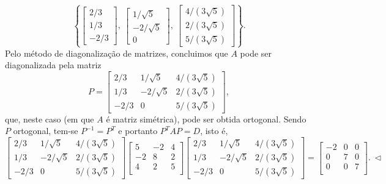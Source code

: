 \documentclass[../livro.tex]{subfiles}
\begin{document}
\begin{example}
	\begin{equation}
	\left\lbrace
	\begin{bmatrix}
	2/3 \\ 1/3 \\ -2/3
	\end{bmatrix}, \
	\begin{bmatrix}
	1/\sqrt{5} \\ -2/\sqrt{5} \\ 0
	\end{bmatrix}, \
	\begin{bmatrix}
	4/(3\sqrt{5}) \\ 2/(3\sqrt{5}) \\ 5/(3\sqrt{5})
	\end{bmatrix}
	\right\rbrace.
	\end{equation} Pelo método de diagonalização de matrizes, concluimos que $A$ pode ser diagonalizada pela matriz 
	\begin{equation}
	P = 
	\begin{bmatrix}
	2/3  & 1/\sqrt{5}  & 4/(3\sqrt{5}) \\ 
	1/3  & -2/\sqrt{5} & 2/(3\sqrt{5}) \\ 
	-2/3 &       0     & 5/(3\sqrt{5})
	\end{bmatrix},
	\end{equation} que, neste caso (em que $A$ é matriz simétrica), pode ser obtida ortogonal. Sendo $P$ ortogonal, tem-se $P^{-1} = P^T$ e portanto $P^{T} A P =  D$, isto é,
	\begin{equation}
	\begin{bmatrix}
	2/3  & 1/\sqrt{5}  & 4/(3\sqrt{5}) \\ 
	1/3  & -2/\sqrt{5} & 2/(3\sqrt{5}) \\ 
	-2/3 &       0     & 5/(3\sqrt{5})
	\end{bmatrix}
	\begin{bmatrix}
	5 & -2 & 4 \\  
	-2 & 8 & 2 \\
	4 & 2 & 5 \\
	\end{bmatrix}
	\begin{bmatrix}
	2/3  & 1/\sqrt{5}  & 4/(3\sqrt{5}) \\ 
	1/3  & -2/\sqrt{5} & 2/(3\sqrt{5}) \\ 
	-2/3 &       0     & 5/(3\sqrt{5})
	\end{bmatrix} = 
	\begin{bmatrix}
	-2& 0 & 0 \\
	0 & 7 & 0 \\
	0 & 0 & 7 \\
	\end{bmatrix}. \ \lhd
	\end{equation}
\end{example}
\end{document}
